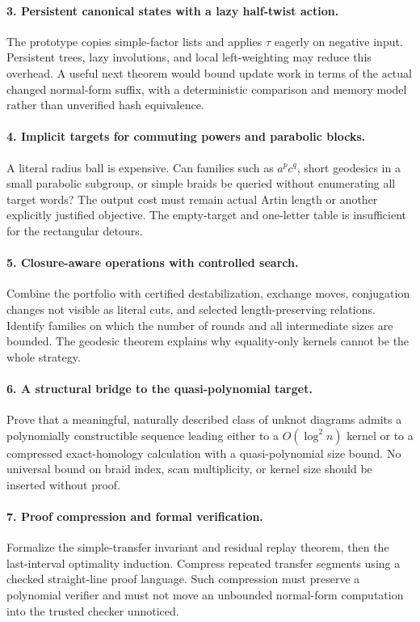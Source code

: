 \documentclass[11pt,a4paper]{article}
\theoremstyle{definition}\newtheorem{definition}[theorem]{Definition}
\theoremstyle{remark}\newtheorem{remark}[theorem]{Remark}
\begin{document}
\paragraph{3. Persistent canonical states with a lazy half-twist action.}
The prototype copies simple-factor lists and applies $\tau$ eagerly on
negative input. Persistent trees, lazy involutions, and local left-weighting
may reduce this overhead. A useful next theorem would bound update work in
terms of the actual changed normal-form suffix, with a deterministic
comparison and memory model rather than unverified hash equivalence.

\paragraph{4. Implicit targets for commuting powers and parabolic blocks.}
A literal radius ball is expensive. Can families such as $a^pc^q$,
short geodesics in a small parabolic subgroup, or simple braids be queried
without enumerating all target words? The output cost must remain actual
Artin length or another explicitly justified objective. The empty-target
and one-letter table is insufficient for the rectangular detours.

\paragraph{5. Closure-aware operations with controlled search.}
Combine the portfolio with certified destabilization, exchange moves,
conjugation changes not visible as literal cuts, and selected
length-preserving relations. Identify families on which the number of
rounds and all intermediate sizes are bounded. The geodesic theorem
explains why equality-only kernels cannot be the whole strategy.

\paragraph{6. A structural bridge to the quasi-polynomial target.}
Prove that a meaningful, naturally described class of unknot diagrams
admits a polynomially constructible sequence leading either to a
$O(\log^2 n)$ kernel or to a compressed exact-homology calculation with a
quasi-polynomial size bound. No universal bound on braid index, scan
multiplicity, or kernel size should be inserted without proof.

\paragraph{7. Proof compression and formal verification.}
Formalize the simple-transfer invariant and residual replay theorem,
then the last-interval optimality induction. Compress repeated transfer
segments using a checked straight-line proof language. Such compression
must preserve a polynomial verifier and must not move an unbounded
normal-form computation into the trusted checker unnoticed.
\end{document}
